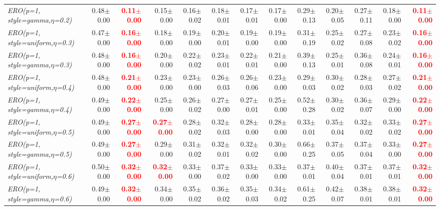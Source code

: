 \documentclass[nohyperref]{article}
\theoremstyle{plain}
\theoremstyle{definition}
\theoremstyle{remark}
\newcommand{\red}[1]{\textcolor{red}{\textbf{#1}}}
\begin{document}
\begin{table*}[!ht]
{\begin{tabular}{lrr|rrrrr|rrrrr}
			{\it ERO(p=1, style=gamma,$\eta$=0.2)} & 0.48$\pm$0.00 & \red{0.11$\pm$0.00} & 0.15$\pm$0.00 & 0.16$\pm$0.02 & 0.18$\pm$0.01 & 0.17$\pm$0.01 & 0.17$\pm$0.00 & 0.29$\pm$0.13 & 0.20$\pm$0.05 & 0.27$\pm$0.11 & 0.18$\pm$0.00 & \red{0.11$\pm$0.00} \\
			{\it ERO(p=1, style=uniform,$\eta$=0.3)} & 0.47$\pm$0.00 & \red{0.16$\pm$0.00} & 0.18$\pm$0.00 & 0.19$\pm$0.00 & 0.20$\pm$0.01 & 0.19$\pm$0.00 & 0.19$\pm$0.00 & 0.31$\pm$0.19 & 0.25$\pm$0.02 & 0.27$\pm$0.08 & 0.23$\pm$0.02 & \red{0.16$\pm$0.00} \\
			{\it ERO(p=1, style=gamma,$\eta$=0.3)} & 0.48$\pm$0.00 & \red{0.16$\pm$0.00} & 0.20$\pm$0.00 & 0.22$\pm$0.02 & 0.23$\pm$0.01 & 0.22$\pm$0.01 & 0.21$\pm$0.00 & 0.39$\pm$0.13 & 0.25$\pm$0.01 & 0.36$\pm$0.08 & 0.24$\pm$0.01 & \red{0.16$\pm$0.00} \\
			{\it ERO(p=1, style=uniform,$\eta$=0.4)} & 0.48$\pm$0.00 & \red{0.21$\pm$0.00} & 0.23$\pm$0.00 & 0.23$\pm$0.00 & 0.26$\pm$0.03 & 0.26$\pm$0.06 & 0.23$\pm$0.00 & 0.29$\pm$0.03 & 0.30$\pm$0.02 & 0.28$\pm$0.03 & 0.27$\pm$0.02 & \red{0.21$\pm$0.00} \\
			{\it ERO(p=1, style=gamma,$\eta$=0.4)} & 0.49$\pm$0.00 & \red{0.22$\pm$0.00} & 0.25$\pm$0.00 & 0.26$\pm$0.02 & 0.27$\pm$0.00 & 0.27$\pm$0.01 & 0.25$\pm$0.00 & 0.52$\pm$0.28 & 0.30$\pm$0.02 & 0.36$\pm$0.07 & 0.29$\pm$0.00 & \red{0.22$\pm$0.00} \\
			{\it ERO(p=1, style=uniform,$\eta$=0.5)} & 0.49$\pm$0.00 & \red{0.27$\pm$0.00} & \red{0.27$\pm$0.00} & 0.28$\pm$0.02 & 0.32$\pm$0.03 & 0.28$\pm$0.00 & 0.28$\pm$0.00 & 0.33$\pm$0.01 & 0.35$\pm$0.04 & 0.32$\pm$0.02 & 0.33$\pm$0.02 & \red{0.27$\pm$0.00} \\
			{\it ERO(p=1, style=gamma,$\eta$=0.5)} & 0.49$\pm$0.00 & \red{0.27$\pm$0.00} & 0.29$\pm$0.00 & 0.31$\pm$0.02 & 0.32$\pm$0.01 & 0.32$\pm$0.02 & 0.30$\pm$0.00 & 0.66$\pm$0.25 & 0.37$\pm$0.05 & 0.37$\pm$0.04 & 0.33$\pm$0.00 & \red{0.27$\pm$0.00} \\
			{\it ERO(p=1, style=uniform,$\eta$=0.6)} & 0.50$\pm$0.00 & \red{0.32$\pm$0.00} & \red{0.32$\pm$0.00} & 0.33$\pm$0.00 & 0.37$\pm$0.02 & 0.33$\pm$0.00 & 0.33$\pm$0.00 & 0.37$\pm$0.01 & 0.40$\pm$0.04 & 0.37$\pm$0.01 & 0.37$\pm$0.01 & \red{0.32$\pm$0.00} \\
			{\it ERO(p=1, style=gamma,$\eta$=0.6)} & 0.49$\pm$0.00 & \red{0.32$\pm$0.00} & 0.34$\pm$0.00 & 0.35$\pm$0.02 & 0.36$\pm$0.02 & 0.35$\pm$0.03 & 0.34$\pm$0.02 & 0.61$\pm$0.25 & 0.42$\pm$0.07 & 0.38$\pm$0.01 & 0.38$\pm$0.01 & \red{0.32$\pm$0.00} \\

\end{tabular}}
\end{table*}
\end{document}
